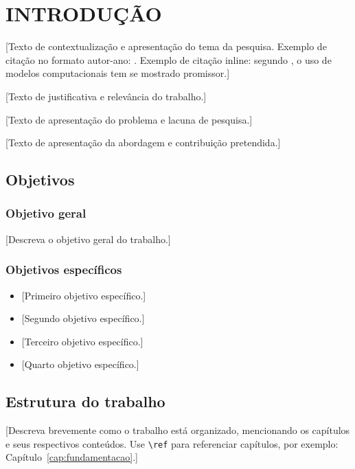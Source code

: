 %

\chapter{INTRODUÇÃO}
\label{cap:introducao}

[Texto de contextualização e apresentação do tema da pesquisa.
Exemplo de citação no formato autor-ano: \cite{exemplo2024}.
Exemplo de citação inline: segundo , o uso de
modelos computacionais tem se mostrado promissor.]

[Texto de justificativa e relevância do trabalho.]

[Texto de apresentação do problema e lacuna de pesquisa.]

[Texto de apresentação da abordagem e contribuição pretendida.]

\section{Objetivos}
\label{sec:objetivos}

\subsection{Objetivo geral}
\label{sec:objetivo-geral}

[Descreva o objetivo geral do trabalho.]

\subsection{Objetivos específicos}
\label{sec:objetivos-especificos}

\begin{itemize}
    \item {}[Primeiro objetivo específico.]
    \item {}[Segundo objetivo específico.]
    \item {}[Terceiro objetivo específico.]
    \item {}[Quarto objetivo específico.]
\end{itemize}

\section{Estrutura do trabalho}
\label{sec:estrutura}

[Descreva brevemente como o trabalho está organizado, mencionando
os capítulos e seus respectivos conteúdos. Use \texttt{\textbackslash ref}
para referenciar capítulos, por exemplo: Capítulo~\ref{cap:fundamentacao}.]
